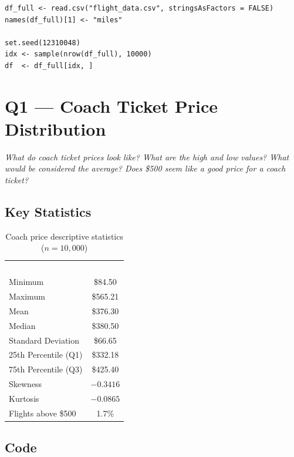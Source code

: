\documentclass[12pt, a4paper]{report}
\newcommand{\thead}[1]{\cellcolor{themeHeaderBg}\textcolor{white}{\textbf{#1}}}
\newcommand{\talt}{\rowcolor{themeRowAlt}}
\newcommand{\trow}{\rowcolor{white}}
\begin{document}
\begin{lstlisting}[style=Rcode, caption={R — Load dataset and draw 10{,}000-row reproducible sample}]
df_full <- read.csv("flight_data.csv", stringsAsFactors = FALSE)
names(df_full)[1] <- "miles"

set.seed(12310048)
idx <- sample(nrow(df_full), 10000)
df  <- df_full[idx, ]
\end{lstlisting}

\chapter{Q1 — Coach Ticket Price Distribution}

\textit{What do coach ticket prices look like? What are the high and low values? What would be considered the average? Does \$500 seem like a good price for a coach ticket?}

\section{Key Statistics}

\begin{table}[H]
\centering
\renewcommand{\arraystretch}{1.3}
\begin{tabular}{lc}
\thead{Statistic} & \thead{Value} \\
\talt Minimum             & \$84.50 \\
\trow Maximum             & \$565.21 \\
\talt Mean                & \$376.30 \\
\trow Median              & \$380.50 \\
\talt Standard Deviation  & \$66.65 \\
\trow 25th Percentile (Q1) & \$332.18 \\
\talt 75th Percentile (Q3) & \$425.40 \\
\trow Skewness            & $-0.3416$ \\
\talt Kurtosis            & $-0.0865$ \\
\trow Flights above \$500 & 1.7\% \\
\end{tabular}
\caption{Coach price descriptive statistics ($n = 10{,}000$)}
\end{table}

\section{Code}
\end{document}
